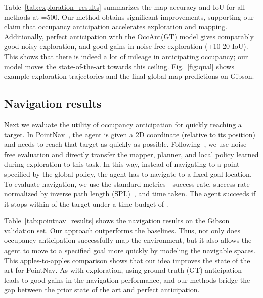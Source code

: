 \documentclass[runningheads]{llncs}
\begin{document}
Table~\ref{tab:exploration_results} summarizes the map accuracy and IoU for all methods at =500. Our method obtains significant improvements, supporting our claim that occupancy anticipation accelerates exploration and mapping. Additionally, perfect anticipation with the OccAnt(GT) model gives comparably good noisy exploration,  and good gains in noise-free exploration (+10-20  IoU). This shows that there is indeed a lot of mileage in anticipating occupancy; our model moves the state-of-the-art towards this ceiling. Fig.~\ref{fig:qual} shows example exploration trajectories and the final global map predictions on Gibson.




\subsection{Navigation results}\label{sec:exp_navigation}

Next we evaluate the utility of occupancy anticipation for quickly reaching a target. In PointNav~\cite{savva2017minos,anderson2018evaluation}, the agent is given a 2D coordinate (relative to its position) and needs to reach that target as quickly as possible. Following~\cite{chaplot2020learning}, we use noise-free evaluation and directly transfer the mapper, planner, and local policy learned during exploration to this task. In this way, instead of navigating to a point specified by the global policy, the agent has to navigate to a fixed goal location. To evaluate navigation, we use the standard metrics---success rate, success rate normalized by inverse path length (SPL)~\cite{anderson2018evaluation}, and time taken. The agent succeeds if it stops within  of the target under a time budget of .

Table~\ref{tab:pointnav_results} shows the navigation results on the Gibson validation set. Our approach outperforms the baselines. Thus, not only does occupancy anticipation successfully map the environment, but it also allows the agent to move to a specified goal more quickly by modeling the navigable spaces. This apples-to-apples comparison shows that our idea improves the state of the art for PointNav. As with exploration, using ground truth (GT) anticipation leads to good gains in the navigation performance, and our methods bridge the gap between the prior state of the art and perfect anticipation.
\end{document}
